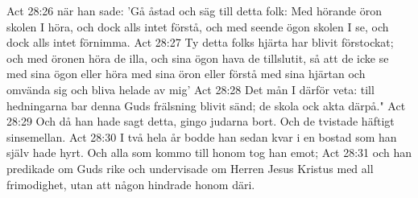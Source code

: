 Act 28:26  när han sade: 'Gå åstad och säg till detta folk: Med hörande öron skolen I höra, och dock alls intet förstå, och med seende ögon skolen I se, och dock alls intet förnimma.
Act 28:27  Ty detta folks hjärta har blivit förstockat; och med öronen höra de illa, och sina ögon hava de tillslutit, så att de icke se med sina ögon eller höra med sina öron eller förstå med sina hjärtan och omvända sig och bliva helade av mig'
Act 28:28  Det mån I därför veta: till hedningarna bar denna Guds frälsning blivit sänd; de skola ock akta därpå."
Act 28:29  Och då han hade sagt detta, gingo judarna bort. Och de tvistade häftigt sinsemellan.
Act 28:30  I två hela år bodde han sedan kvar i en bostad som han själv hade hyrt. Och alla som kommo till honom tog han emot;
Act 28:31  och han predikade om Guds rike och undervisade om Herren Jesus Kristus med all frimodighet, utan att någon hindrade honom däri.


